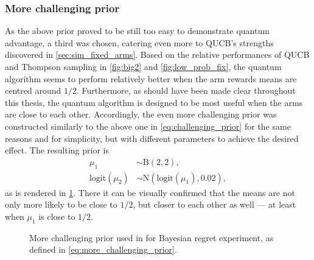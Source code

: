 \clearpage
\subsubsection{More challenging prior}
As the above prior proved to be still too easy to demonstrate quantum advantage, a third was chosen, catering even more to QUCB's strengths discovered in \cref{sec:sim_fixed_arms}.
Based on the relative performances of QUCB and Thompson sampling in \cref{fig:big2} and \cref{fig:low_prob_fix}, the quantum algorithm seems to perform relatively better when the arm rewards means are centred around $1/2$.
Furthermore, as should have been made clear throughout this thesis, the quantum algorithm is designed to be most useful when the arms are close to each other.
Accordingly, the even more challenging prior was constructed similarly to the above one in \cref{eq:challenging_prior} for the same reasons and for simplicity, but with different parameters to achieve the desired effect.
The resulting prior is
\begin{equation}
    \label{eq:more_challenging_prior}
    \begin{aligned}
        \mu_1               & \sim \text{B}(2, 2),                      \\
        \text{logit}(\mu_2) & \sim \text{N}(\text{logit}(\mu_1), 0.02),
    \end{aligned}
\end{equation}
as is rendered in \cref{fig:prior2}.
There it can be visually confirmed that the means are not only more likely to be close to $1/2$, but closer to each other as well — at least when $\mu_1$ is close to $1/2$.

\begin{figure}[p]
    \centering
    \caption[
        More challenging prior used in Bayesian regret experiment.
    ]
    {
        More challenging prior used in for Bayesian regret experiment, as defined in \cref{eq:more_challenging_prior}.
    }
    \label{fig:prior2}
\end{figure}


